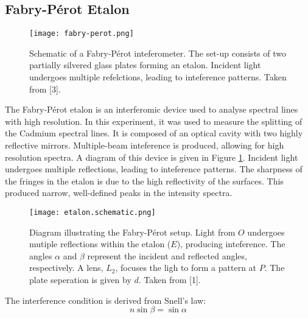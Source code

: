 \documentclass[11pt,twocolumn, a4paper]{article}
\numberwithin{equation}{section} %
\numberwithin{figure}{section} %
\numberwithin{table}{section} %
\begin{document}
\subsection{Fabry-Pérot Etalon}
\begin{figure}[H]
    \centering
    \texttt{[image: fabry-perot.png]}
    \caption{Schematic of a Fabry-Pérot inteferometer. The set-up consists of two partially silvered glass plates forming an etalon. Incident light undergoes multiple refelctions, leading to inteference patterns. Taken from [3].}
    \label{fig:FP}
\end{figure}
The Fabry-Pérot etalon is an interferomic device used to analyse spectral lines with high resolution. In this experiment, it was used to measure the splitting of the Cadmium spectral lines. It is composed of an optical cavity with two highly reflective mirrors. Multiple-beam inteference is produced, allowing for high resolution spectra.  A diagram of this device is given in Figure \ref{fig:FP}.  Incident light undergoes multiple reflections, leading to inteference patterns.  The sharpness of the fringes in the etalon is due to the high reflectivity of the surfaces. This produced narrow, well-defined peaks in the intensity spectra. 

\begin{figure}[H]
    \centering
    \texttt{[image: etalon.schematic.png]}
    \caption{Diagram illustrating the Fabry-Pérot setup. Light from \(O\) undergoes mutiple reflections within the etalon (\(E\)), producing inteference. The angles \(\alpha\) and \(\beta\) represent the incident and reflected angles, respectively. A lens, \(L_2\), focuses the ligh to form a pattern at \(P\). The plate seperation is given by \(d\). Taken from [1].}
    \label{fig:et}
\end{figure}

The interference condition is derived from Snell's law:
\begin{equation}
    n \sin \beta = \sin \alpha
\end{equation}
\end{document}
